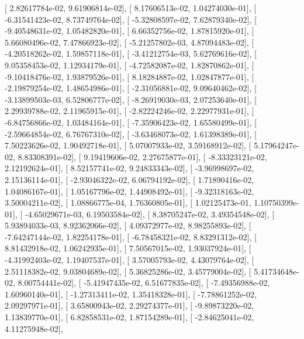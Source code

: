 \documentclass{article}
\begin{document}
       [  2.82617784e-02,   9.61906814e-02],
       [  8.17606513e-02,   1.04274030e-01],
       [ -6.31541423e-02,   8.73749764e-02],
       [ -5.32808597e-02,   7.62879340e-02],
       [ -9.40548631e-02,   1.05482820e-01],
       [  6.66352756e-02,   1.87815920e-01],
       [  5.66080496e-02,   7.47866923e-02],
       [ -5.21257802e-03,   4.87094483e-02],
       [ -4.20518262e-02,   1.59857118e-01],
       [ -3.41212754e-03,   5.62769616e-02],
       [  9.05358453e-02,   1.12934179e-01],
       [ -4.72582087e-02,   1.82870862e-01],
       [ -9.10418476e-02,   1.93879526e-01],
       [  8.18284887e-02,   1.02847877e-01],
       [ -2.19879254e-02,   1.48654986e-01],
       [ -2.31056881e-02,   9.09640462e-02],
       [ -3.13899503e-03,   6.52806777e-02],
       [ -8.26919030e-03,   2.07253640e-01],
       [  2.29939788e-02,   2.11965915e-01],
       [ -2.82224246e-02,   2.22977931e-01],
       [ -6.84756866e-02,   1.03484164e-01],
       [ -7.35906423e-02,   1.65580499e-01],
       [ -2.59664854e-02,   6.76767310e-02],
       [ -3.63468073e-02,   1.61398389e-01],
       [  7.50223626e-02,   1.90492718e-01],
       [  5.07007933e-02,   3.59168912e-02],
       [  5.17964247e-02,   8.83308391e-02],
       [  9.19419606e-02,   2.27675877e-01],
       [ -8.33323121e-02,   2.12192624e-01],
       [  8.52157741e-02,   9.24833343e-02],
       [ -3.96998697e-02,   2.15136114e-01],
       [ -2.93046322e-02,   6.06794192e-02],
       [  1.71890416e-02,   1.04086167e-01],
       [  1.05167796e-02,   1.44908492e-01],
       [ -9.32318163e-02,   3.50004211e-02],
       [  1.08866775e-04,   1.76360805e-01],
       [  1.02125473e-01,   1.10750399e-01],
       [ -4.65029671e-03,   6.19503584e-02],
       [  8.38705247e-02,   3.49354548e-02],
       [  5.93894033e-03,   8.92362066e-02],
       [  4.09372977e-02,   8.98255893e-02],
       [ -7.64247144e-02,   1.82254178e-01],
       [ -6.78458321e-02,   8.83291312e-02],
       [  8.81432918e-02,   1.06242935e-01],
       [  7.50567015e-02,   1.93037924e-01],
       [ -4.31992403e-02,   1.19407537e-01],
       [  3.57005793e-02,   4.43079764e-02],
       [  2.51118382e-02,   9.03804689e-02],
       [  5.36825286e-02,   3.45779004e-02],
       [  5.41734648e-02,   8.00754441e-02],
       [ -5.41947435e-02,   6.51677835e-02],
       [ -7.49356988e-02,   1.60960140e-01],
       [ -1.27313411e-02,   1.35418328e-01],
       [ -7.78861252e-02,   2.09297971e-01],
       [  3.65800943e-02,   2.29274377e-01],
       [ -9.89873220e-02,   1.13839770e-01],
       [  6.82858531e-02,   1.87154289e-01],
       [ -2.84625041e-02,   4.11275948e-02],
\end{document}
